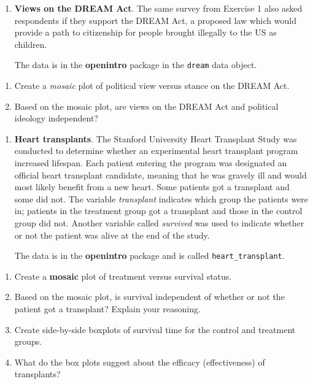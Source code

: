 \documentclass[
  letterpaper,
  DIV=11,
  numbers=noendperiod]{scrreprt}
\begin{document}
\begin{enumerate}
\def\labelenumi{\arabic{enumi}.}
\setcounter{enumi}{1}
\item
  \textbf{Views on the DREAM Act}. The same survey from Exercise 1 also
  asked respondents if they support the DREAM Act, a proposed law which
  would provide a path to citizenship for people brought illegally to
  the US as children.

  The data is in the \textbf{openintro} package in the \texttt{dream}
  data object.
\end{enumerate}

\begin{enumerate}
\def\labelenumi{\alph{enumi}.}
\item
  Create a \emph{mosaic} plot of political view versus stance on the
  DREAM Act.
\item
  Based on the mosaic plot, are views on the DREAM Act and political
  ideology independent?
\end{enumerate}

\begin{enumerate}
\def\labelenumi{\arabic{enumi}.}
\setcounter{enumi}{2}
\item
  \textbf{Heart transplants}. The Stanford University Heart Transplant
  Study was conducted to determine whether an experimental heart
  transplant program increased lifespan. Each patient entering the
  program was designated an official heart transplant candidate, meaning
  that he was gravely ill and would most likely benefit from a new
  heart. Some patients got a transplant and some did not. The variable
  \emph{transplant} indicates which group the patients were in; patients
  in the treatment group got a transplant and those in the control group
  did not. Another variable called \emph{survived} was used to indicate
  whether or not the patient was alive at the end of the study.

  The data is in the \textbf{openintro} package and is called
  \texttt{heart\_transplant}.
\end{enumerate}

\begin{enumerate}
\def\labelenumi{\alph{enumi}.}
\item
  Create a \textbf{mosaic} plot of treatment versus survival status.
\item
  Based on the mosaic plot, is survival independent of whether or not
  the patient got a transplant? Explain your reasoning.
\item
  Create side-by-side boxplots of survival time for the control and
  treatment groups.
\item
  What do the box plots suggest about the efficacy (effectiveness) of
  transplants?
\end{enumerate}
\end{document}
